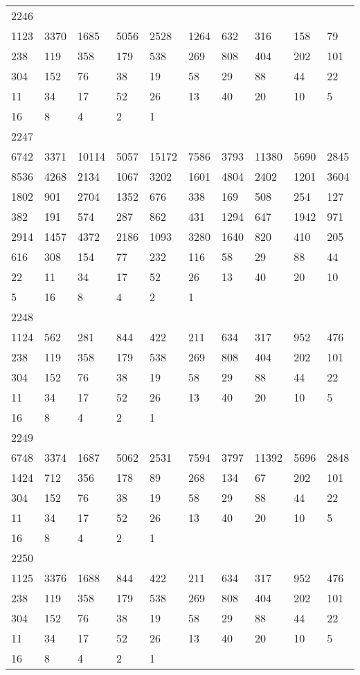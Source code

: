 \begin{longtable}{*{10}{l}}
2246&&&&&&&&&\\
1123& 3370& 1685& 5056& 2528& 1264& 632& 316& 158& 79\\
238& 119& 358& 179& 538& 269& 808& 404& 202& 101\\
304& 152& 76& 38& 19& 58& 29& 88& 44& 22\\
11& 34& 17& 52& 26& 13& 40& 20& 10& 5\\
16& 8& 4& 2& 1& \\

2247&&&&&&&&&\\
6742& 3371& 10114& 5057& 15172& 7586& 3793& 11380& 5690& 2845\\
8536& 4268& 2134& 1067& 3202& 1601& 4804& 2402& 1201& 3604\\
1802& 901& 2704& 1352& 676& 338& 169& 508& 254& 127\\
382& 191& 574& 287& 862& 431& 1294& 647& 1942& 971\\
2914& 1457& 4372& 2186& 1093& 3280& 1640& 820& 410& 205\\
616& 308& 154& 77& 232& 116& 58& 29& 88& 44\\
22& 11& 34& 17& 52& 26& 13& 40& 20& 10\\
5& 16& 8& 4& 2& 1& \\

2248&&&&&&&&&\\
1124& 562& 281& 844& 422& 211& 634& 317& 952& 476\\
238& 119& 358& 179& 538& 269& 808& 404& 202& 101\\
304& 152& 76& 38& 19& 58& 29& 88& 44& 22\\
11& 34& 17& 52& 26& 13& 40& 20& 10& 5\\
16& 8& 4& 2& 1& \\

2249&&&&&&&&&\\
6748& 3374& 1687& 5062& 2531& 7594& 3797& 11392& 5696& 2848\\
1424& 712& 356& 178& 89& 268& 134& 67& 202& 101\\
304& 152& 76& 38& 19& 58& 29& 88& 44& 22\\
11& 34& 17& 52& 26& 13& 40& 20& 10& 5\\
16& 8& 4& 2& 1& \\

2250&&&&&&&&&\\
1125& 3376& 1688& 844& 422& 211& 634& 317& 952& 476\\
238& 119& 358& 179& 538& 269& 808& 404& 202& 101\\
304& 152& 76& 38& 19& 58& 29& 88& 44& 22\\
11& 34& 17& 52& 26& 13& 40& 20& 10& 5\\
16& 8& 4& 2& 1& \\


\end{longtable}
